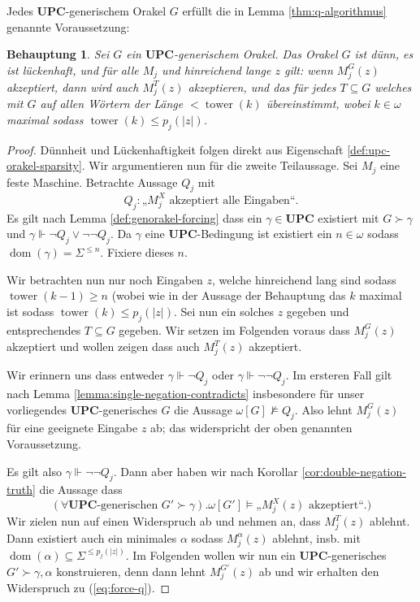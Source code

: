 \documentclass[nofonts]{uebung}
\newtheorem{claim}[theorem]{Behauptung}
\theoremstyle{definition}
\DeclareMathOperator{\dom}{dom}
\DeclareMathOperator{\tower}{tower}
\begin{document}
Jedes $\mathbf{UPC}$-generischem Orakel $G$ erfüllt die in Lemma \ref{thm:q-algorithmus} genannte Voraussetzung:
\begin{claim}
    Sei $G$ ein $\mathbf{UPC}$-generischem Orakel.
    Das Orakel $G$ ist dünn, es ist lückenhaft, und für alle $M_j$ und hinreichend lange $z$ gilt: wenn $M_j^G(z)$ akzeptiert, dann wird auch $M_j^T(z)$ akzeptieren, und das für jedes $T\subseteq G$ welches mit $G$ auf allen Wörtern der Länge $<\tower(k)$ übereinstimmt, wobei $k\in\omega$ maximal sodass $\tower(k)\leq p_j(|z|)$.
\end{claim}
\begin{proof}
    Dünnheit und Lückenhaftigkeit folgen direkt aus Eigenschaft \ref{def:upc-orakel-sparsity}.
    Wir argumentieren nun für die zweite Teilaussage. Sei $M_j$ eine feste Maschine.
    Betrachte Aussage $Q_j$ mit
    \[ Q_j: \text{„$M_j^X$ akzeptiert alle Eingaben“}. \]
    Es gilt nach Lemma \ref{def:genorakel-forcing} dass ein $\gamma\in \mathbf{UPC}$ existiert mit $G\succ \gamma$ und $\gamma\Vdash \neg Q_j\lor \neg\neg Q_j$.
    Da $\gamma$ eine $\mathbf{UPC}$-Bedingung ist existiert ein $n\in\omega$ sodass $\dom(\gamma)=\Sigma^{\leq n}$. Fixiere dieses $n$.


    Wir betrachten nun nur noch Eingaben $z$, welche hinreichend lang sind sodass $\tower(k-1)\geq n$ (wobei wie in der Aussage der Behauptung das $k$ maximal ist sodass $\tower(k)\leq p_j(|z|)$. %
    Sei nun ein solches $z$ gegeben und entsprechendes $T\subseteq G$ gegeben.
    Wir setzen im Folgenden voraus dass $M_j^G(z)$ akzeptiert und wollen zeigen dass auch $M_j^T(z)$ akzeptiert.

    Wir erinnern uns dass entweder $\gamma\Vdash\neg Q_j$ oder $\gamma\Vdash\neg\neg Q_j$.
    Im ersteren Fall gilt nach Lemma \ref{lemma:single-negation-contradicts} insbesondere für unser vorliegendes $\mathbf{UPC}$-generisches $G$ die Aussage $\omega[G] \not\vDash Q_j$.
    Also lehnt $M_j^G(z)$ für eine geeignete Eingabe $z$ ab; das widerspricht der oben genannten Voraussetzung.

    Es gilt also $\gamma\Vdash\neg\neg Q_j$. Dann aber haben wir nach Korollar \ref{cor:double-negation-truth} die Aussage dass
    \begin{equation} (\forall \text{$\mathbf{UPC}$-generischen $G'\succ \gamma$}). \omega[G'] \vDash \text{„$M_j^X(z)$ akzeptiert“}.\label{eq:force-q}) \end{equation}
    Wir zielen nun auf einen Widerspruch ab und nehmen an, dass $M_j^T(z)$ ablehnt.
    Dann existiert auch ein minimales $\alpha$ sodass $M_j^\alpha(z)$ ablehnt, insb. mit $\dom(\alpha)\subseteq\Sigma^{\leq p_j(|z|)}$. Im Folgenden wollen wir nun ein $\mathbf{UPC}$-generisches $G'\succ \gamma,\alpha$ konstruieren, denn dann lehnt $M_j^{G'}(z)$ ab und wir erhalten den Widerspruch zu (\ref{eq:force-q}).


\end{proof}
\end{document}
